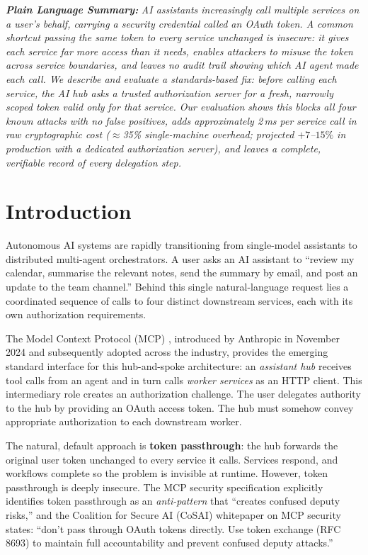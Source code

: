 \documentclass[journal]{IEEEtran}
\begin{document}
\vspace{4pt}
\noindent\textit{\textbf{Plain Language Summary:}}
\textit{AI assistants increasingly call multiple services on a user's behalf,
carrying a security credential called an OAuth token. A common
shortcut passing the same token to every service unchanged is insecure: it
gives each service far more access than it needs, enables attackers to misuse the
token across service boundaries, and leaves no audit trail showing which AI agent
made each call. We describe and evaluate a standards-based fix: before calling
each service, the AI hub asks a trusted authorization server for a fresh,
narrowly scoped token valid only for that service. Our evaluation shows this
blocks all four known attacks with no false positives, adds approximately 2\,ms
per service call in raw cryptographic cost ($\approx$35\% single-machine overhead;
projected $+7$--$15\%$ in production with a dedicated authorization server),
and leaves a complete, verifiable record of every delegation step.}

\section{Introduction}
\label{sec:introduction}

Autonomous AI systems are rapidly transitioning from single-model assistants to
distributed multi-agent orchestrators. A user asks an AI assistant to
``review my calendar, summarise the relevant notes, send the summary by email, and
post an update to the team channel.'' Behind this single natural-language request
lies a coordinated sequence of calls to four distinct downstream services, each
with its own authorization requirements.

The Model Context Protocol (MCP) \cite{mcp_spec,mcp_wiki}, introduced by Anthropic in
November 2024 and subsequently adopted across the industry, provides the emerging
standard interface for this hub-and-spoke architecture: an \textit{assistant hub}
receives tool calls from an agent and in turn calls \textit{worker services} as
an HTTP client. This intermediary role creates an authorization challenge. The
user delegates authority to the hub by providing an OAuth access token. The hub
must somehow convey appropriate authorization to each downstream worker.

The natural, default approach is \textbf{token passthrough}: the hub forwards
the original user token unchanged to every service it calls. Services respond,
and workflows complete so the problem is invisible at runtime. However,
token passthrough is deeply insecure. The MCP security specification \cite{mcp_security} explicitly
identifies token passthrough as an \textit{anti-pattern} that ``creates confused
deputy risks,'' and the Coalition for Secure AI (CoSAI) whitepaper on MCP
security \cite{cosai_mcp} states: ``don't pass through OAuth tokens directly.
Use token exchange (RFC 8693) to maintain full accountability and prevent confused
deputy attacks.''
\end{document}
